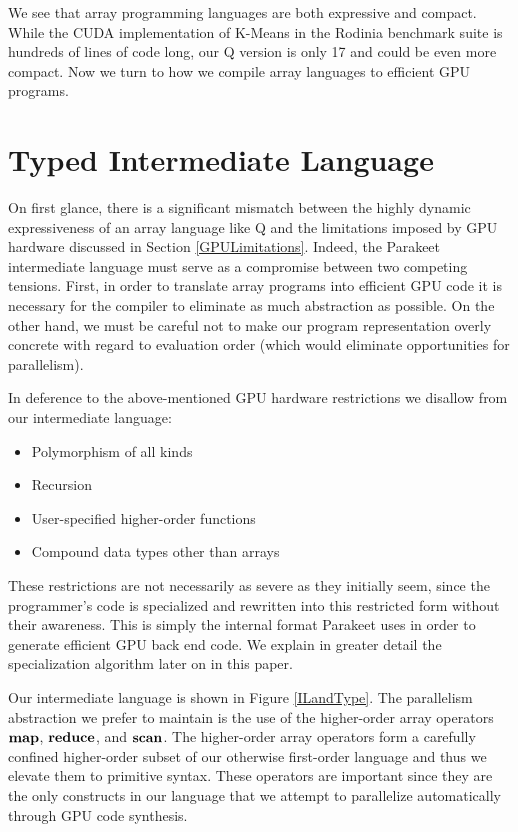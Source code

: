\documentclass[preprint]{sigplanconf}
\begin{document}
We see that array programming languages are both expressive and compact.  While
the CUDA implementation of K-Means in the Rodinia benchmark suite is hundreds of
lines of code long, our Q version is only 17 and could be even more compact.
Now we turn to how we compile array languages to efficient GPU programs.

\section{Typed Intermediate Language}
On first glance, there is a significant mismatch between the highly dynamic
expressiveness of an array language like Q and the limitations imposed by GPU
hardware discussed in Section \ref{GPULimitations}. Indeed, the Parakeet
intermediate language must serve as a compromise between two competing tensions.
First, in order to translate array programs into efficient GPU code it is
necessary for the compiler to eliminate as much abstraction as possible. On the
other hand, we must be careful not to make our program representation overly
concrete with regard to evaluation order (which would eliminate opportunities
for parallelism).

In deference to the above-mentioned GPU hardware restrictions we disallow from
our intermediate language:

\begin{itemize}
\item Polymorphism of all kinds
\item Recursion
\item User-specified higher-order functions
\item Compound data types other than arrays
\end{itemize}

These restrictions are not necessarily as severe as they initially seem, since
the programmer's code is specialized and rewritten into this restricted form
without their awareness.  This is simply the internal format Parakeet uses in
order to generate efficient GPU back end code. We explain in greater detail the
specialization algorithm later on in this paper.

Our intermediate language is shown in Figure \ref{ILandType}. The parallelism
abstraction we prefer to maintain is the use of the higher-order array operators
$\mbox{\textbf{map}}$, $\mbox{\textbf{reduce}}$, and $\mbox{\textbf{scan}}$. The higher-order array operators
form a carefully confined higher-order subset of our otherwise first-order
language and thus we elevate them to primitive syntax. These operators are
important since they are the only constructs in our language that we attempt to
parallelize automatically through GPU code synthesis.
\end{document}
